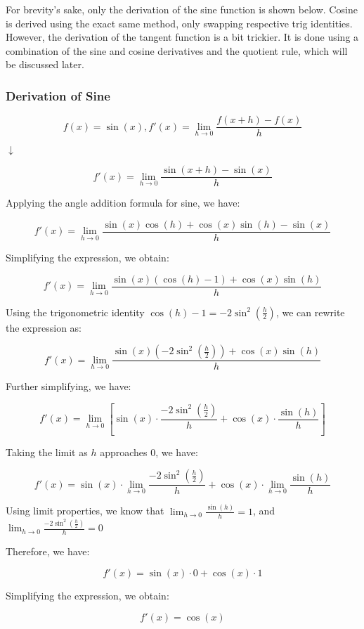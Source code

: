 \documentclass[11pt]{article}
\begin{document}
For brevity's sake, only the derivation of the sine function is shown below. Cosine is derived using the exact same method, only swapping respective trig identities. However, the derivation of the tangent function is a bit trickier. It is done using a combination of the sine and cosine derivatives and the quotient rule, which will be discussed later. 

\subsubsection{Derivation of Sine}
\[f(x) = \sin(x), f'(x) = \lim_{{h \to 0}} \frac{{f(x + h) - f(x)}}{{h}}\]
\begin{center}
$\downarrow$
\end{center}
\[f'(x) = \lim_{{h \to 0}} \frac{{\sin(x + h) - \sin(x)}}{{h}}\]

Applying the angle addition formula for sine, we have:

\[f'(x) = \lim_{{h \to 0}} \frac{{\sin(x)\cos(h) + \cos(x)\sin(h) - \sin(x)}}{{h}}\]

Simplifying the expression, we obtain:

\[f'(x) = \lim_{{h \to 0}} \frac{{\sin(x)(\cos(h) - 1) + \cos(x)\sin(h)}}{{h}}\]

Using the trigonometric identity \(\cos(h) - 1 = -2\sin^2\left(\frac{h}{2}\right)\), we can rewrite the expression as:

\[f'(x) = \lim_{{h \to 0}} \frac{{\sin(x)(-2\sin^2\left(\frac{h}{2}\right)) + \cos(x)\sin(h)}}{{h}}\]

Further simplifying, we have:

\[f'(x) = \lim_{{h \to 0}} \left[\sin(x) \cdot \frac{{-2\sin^2\left(\frac{h}{2}\right)}}{{h}} + \cos(x) \cdot \frac{{\sin(h)}}{{h}}\right]\]

Taking the limit as \(h\) approaches 0, we have:

\[f'(x) = \sin(x) \cdot \lim_{{h \to 0}} \frac{{-2\sin^2\left(\frac{h}{2}\right)}}{{h}} + \cos(x) \cdot \lim_{{h \to 0}} \frac{{\sin(h)}}{{h}}\]

Using  limit properties, we know that 
\(\lim_{{h \to 0}} \frac{{\sin(h)}}{{h}} = 1\), and \(\lim_{{h \to 0}} \frac{{-2\sin^2\left(\frac{h}{2}\right)}}{{h}} = 0\)

Therefore, we have:

\[f'(x) = \sin(x) \cdot 0 + \cos(x) \cdot 1\]

Simplifying the expression, we obtain:

\[f'(x) = \cos(x)\]
\end{document}
